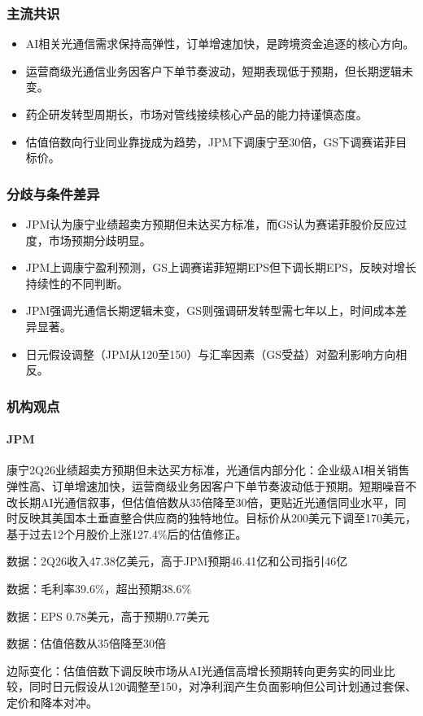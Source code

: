 \documentclass[11pt]{ctexart}
\begin{document}
\subsubsection*{主流共识}
\begin{itemize}
  \item AI相关光通信需求保持高弹性，订单增速加快，是跨境资金追逐的核心方向。
  \item 运营商级光通信业务因客户下单节奏波动，短期表现低于预期，但长期逻辑未变。
  \item 药企研发转型周期长，市场对管线接续核心产品的能力持谨慎态度。
  \item 估值倍数向行业同业靠拢成为趋势，JPM下调康宁至30倍，GS下调赛诺菲目标价。
\end{itemize}
\subsubsection*{分歧与条件差异}
\begin{itemize}
  \item JPM认为康宁业绩超卖方预期但未达买方标准，而GS认为赛诺菲股价反应过度，市场预期分歧明显。
  \item JPM上调康宁盈利预测，GS上调赛诺菲短期EPS但下调长期EPS，反映对增长持续性的不同判断。
  \item JPM强调光通信长期逻辑未变，GS则强调研发转型需七年以上，时间成本差异显著。
  \item 日元假设调整（JPM从120至150）与汇率因素（GS受益）对盈利影响方向相反。
\end{itemize}
\subsubsection*{机构观点}
\paragraph{JPM} 康宁2Q26业绩超卖方预期但未达买方标准，光通信内部分化：企业级AI相关销售弹性高、订单增速加快，运营商级业务因客户下单节奏波动低于预期。短期噪音不改长期AI光通信叙事，但估值倍数从35倍降至30倍，更贴近光通信同业水平，同时反映其美国本土垂直整合供应商的独特地位。目标价从200美元下调至170美元，基于过去12个月股价上涨127.4\%后的估值修正。
{\small\color{refgray}数据：2Q26收入47.38亿美元，高于JPM预期46.41亿和公司指引46亿\par}
{\small\color{refgray}数据：毛利率39.6\%，超出预期38.6\%\par}
{\small\color{refgray}数据：EPS 0.78美元，高于预期0.77美元\par}
{\small\color{refgray}数据：估值倍数从35倍降至30倍\par}
{\small\color{refgray}边际变化：估值倍数下调反映市场从AI光通信高增长预期转向更务实的同业比较，同时日元假设从120调整至150，对净利润产生负面影响但公司计划通过套保、定价和降本对冲。\par}
\end{document}
